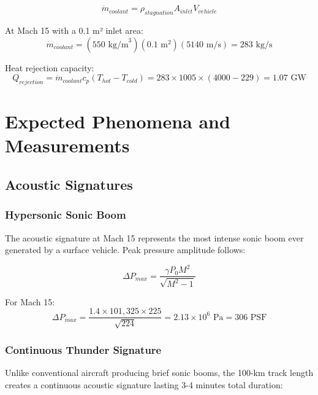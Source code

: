 \documentclass[12pt,a4paper]{article}
\begin{document}
\begin{equation}
\dot{m}_{coolant} = \rho_{stagnation} A_{inlet} V_{vehicle}
\label{eq:coolant_mass_flow}
\end{equation}

At Mach 15 with a 0.1 m² inlet area:
\begin{equation}
\dot{m}_{coolant} = (550 \text{ kg/m}^3)(0.1 \text{ m}^2)(5140 \text{ m/s}) = 283 \text{ kg/s}
\label{eq:mass_flow_calc}
\end{equation}

Heat rejection capacity:
\begin{equation}
Q_{rejection} = \dot{m}_{coolant} c_p (T_{hot} - T_{cold}) = 283 \times 1005 \times (4000-229) = 1.07 \text{ GW}
\label{eq:heat_rejection}
\end{equation}

\section{Expected Phenomena and Measurements}

\subsection{Acoustic Signatures}

\subsubsection{Hypersonic Sonic Boom}
The acoustic signature at Mach 15 represents the most intense sonic boom ever generated by a surface vehicle. Peak pressure amplitude follows:

\begin{equation}
\Delta P_{max} = \frac{\gamma P_0 M^2}{\sqrt{M^2-1}}
\label{eq:sonic_boom_pressure}
\end{equation}

For Mach 15:
\begin{equation}
\Delta P_{max} = \frac{1.4 \times 101,325 \times 225}{\sqrt{224}} = 2.13 \times 10^6 \text{ Pa} = 306 \text{ PSF}
\label{eq:boom_pressure_calc}
\end{equation}

\subsubsection{Continuous Thunder Signature}
Unlike conventional aircraft producing brief sonic booms, the 100-km track length creates a continuous acoustic signature lasting 3-4 minutes total duration:
\end{document}
